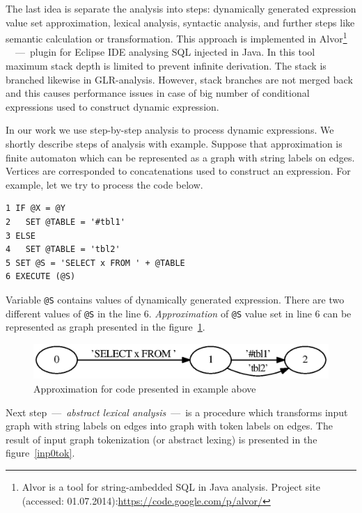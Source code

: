 \documentclass{sigplanconf}
\begin{document}
The last idea is separate the analysis into steps: dynamically generated expression value set approximation, lexical analysis, syntactic analysis, and further steps like semantic calculation or transformation. This approach is implemented in Alvor\footnote{Alvor is a tool for string-ambedded SQL in Java analysis. Project site (accessed: 01.07.2014):\url{https://code.google.com/p/alvor/}} ~\cite{ALVOR1, ALVOR2}~---~plugin for Eclipse IDE analysing SQL injected in Java. In this tool maximum stack depth is limited to prevent infinite derivation. The stack is branched likewise in GLR-analysis. However, stack branches are not merged back and this causes performance issues in case of big number of conditional expressions used to construct dynamic expression.

In our work we use step-by-step analysis to process dynamic expressions. We shortly describe steps of analysis with example. Suppose that approximation is finite automaton which can be represented as a graph with string labels on edges. Vertices are corresponded to concatenations used to construct an expression. For example, let we try to process the code below.

\begin{verbatim}
1 IF @X = @Y
2   SET @TABLE = '#tbl1'
3 ELSE
4   SET @TABLE = 'tbl2'
5 SET @S = 'SELECT x FROM ' + @TABLE
6 EXECUTE (@S)
\end{verbatim}

Variable \verb|@S| contains values of dynamically generated expression. There are two different values of \verb|@S| in the line 6. {\it Approximation} of \verb|@S| value set in line 6 can be represented as graph presented in the figure~\ref{inp0}.
 
\begin{figure}[h!]
    \begin{center}
        \includegraphics[scale=0.5]{Graphs/simpleSQL.eps}
    \end{center}
    \caption{Approximation for code presented in example above}
    \label{inp0}
\end{figure}

Next step~---~{\it abstract lexical analysis}~---~is a procedure which transforms input graph with string labels on edges into graph with token labels on edges. The result of input graph tokenization (or abstract lexing) is presented in the figure~\ref{inp0tok}. 
\end{document}
